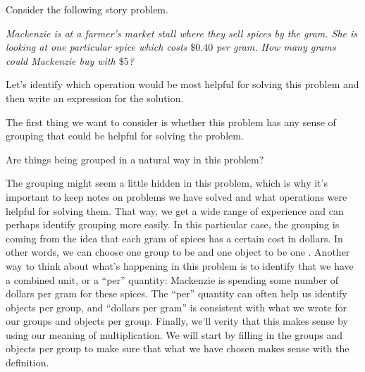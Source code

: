 \documentclass{ximera}
\begin{document}
\begin{example}
Consider the following story problem.

\emph{Mackenzie is at a farmer's market stall where they sell spices by the gram. She is looking at one particular spice which costs $\$0.40$ per gram. How many grams could Mackenzie buy with $\$5$?}

Let's identify which operation would be most helpful for solving this problem and then write an expression for the solution.

The first thing we want to consider is whether this problem has any sense of grouping that could be helpful for solving the problem.
\begin{question}
Are things being grouped in a natural way in this problem?
\begin{multipleChoice}
\end{multipleChoice} 
\end{question}
The grouping might seem a little hidden in this problem, which is why it's important to keep notes on problems we have solved and what operations were helpful for solving them. That way, we get a wide range of experience and can perhaps identify grouping more easily. In this particular case, the grouping is coming from the idea that each gram of spices has a certain cost in dollars. In other words, we can choose one group to be  and one object to be one . Another way to think about what's happening in this problem is to identify that we have a combined unit, or a ``per'' quantity: Mackenzie is spending some number of dollars per gram for these spices. The ``per'' quantity can often help us identify objects per group, and ``dollars per gram'' is consistent with what we wrote for our groups and objects per group. Finally, we'll verity that this makes sense by using our meaning of multiplication. We will start by filling in the groups and objects per group to make sure that what we have chosen makes sense with the definition.

\begin{image}
\end{image}


\end{example}
\end{document}
